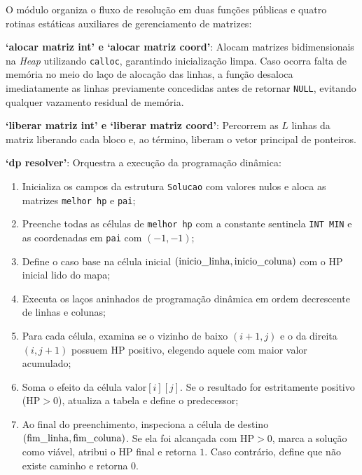 \documentclass[12pt,a4paper]{article}
\makeatletter
\DeclareRobustCommand{\_}{%
  \ifmmode
    \nfss@text{\textunderscore}%
  \else
    \textunderscore\allowbreak
  \fi
}
\makeatother
\begin{document}
O módulo organiza o fluxo de resolução em duas funções públicas e quatro rotinas estáticas auxiliares de gerenciamento de matrizes:

\textbf{`alocar\_matriz\_int' e `alocar\_matriz\_coord'}: Alocam matrizes bidimensionais na \textit{Heap} utilizando \texttt{calloc}, garantindo inicialização limpa. Caso ocorra falta de memória no meio do laço de alocação das linhas, a função desaloca imediatamente as linhas previamente concedidas antes de retornar \texttt{NULL}, evitando qualquer vazamento residual de memória.

\textbf{`liberar\_matriz\_int' e `liberar\_matriz\_coord'}: Percorrem as $L$ linhas da matriz liberando cada bloco e, ao término, liberam o vetor principal de ponteiros.

\textbf{`dp\_resolver'}: Orquestra a execução da programação dinâmica:
\begin{enumerate}
    \item Inicializa os campos da estrutura \texttt{Solucao} com valores nulos e aloca as matrizes \texttt{melhor\_hp} e \texttt{pai};
    \item Preenche todas as células de \texttt{melhor\_hp} com a constante sentinela \texttt{INT\_MIN} e as coordenadas em \texttt{pai} com $(-1,-1)$;
    \item Define o caso base na célula inicial $(\text{inicio\_linha}, \text{inicio\_coluna})$ com o HP inicial lido do mapa;
    \item Executa os laços aninhados de programação dinâmica em ordem decrescente de linhas e colunas;
    \item Para cada célula, examina se o vizinho de baixo $(i+1,j)$ e o da direita $(i,j+1)$ possuem HP positivo, elegendo aquele com maior valor acumulado;
    \item Soma o efeito da célula $\text{valor}[i][j]$. Se o resultado for estritamente positivo ($\text{HP} > 0$), atualiza a tabela e define o predecessor;
    \item Ao final do preenchimento, inspeciona a célula de destino $(\text{fim\_linha}, \text{fim\_coluna})$. Se ela foi alcançada com $\text{HP} > 0$, marca a solução como viável, atribui o HP final e retorna $1$. Caso contrário, define que não existe caminho e retorna $0$.
\end{enumerate}
\end{document}
